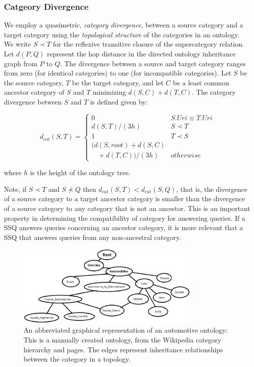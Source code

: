 \subsubsection{Catgeory Divergence}
\label{sec:ctd}

We employ a quasimetric, \textit{category
divergence},
between a source category and a target category using the \textit{topological
structure} of the categories in an ontology. We write $S \prec T$ for the
reflexive
transitive closure of the supercategory relation. Let $d(P,Q)$ represent the hop
distance in the directed ontology inheritance graph from $P$ to $Q$. The
divergence between a source and target category ranges from zero (for identical
categories) to one (for incompatible categories). Let $S$ be the source
category, $T$ be
the target category, and let $C$ be a least common ancestor category of $S$ and
$T$
minimizing $d(S,C) + d(T,C)$. The category divergence between $S$ and $T$ is
defined given by:

\begin{equation}
d_{cat}(S, T) = \begin{cases}
0 & S.{Uri} \equiv T.{Uri}\\
d(S, T)/(3h) & S \prec T\\
1 & T \prec S\\
(d(S,root) + d(S,C) \\ \ \ \ \ + d(T,C))/(3h) & otherwise
\end{cases}
\end{equation}

\noindent where $h$ is the height of the ontology tree.

Note, if $S \prec T$ and $S \not\prec Q$ then $d_{cat}(S,T) <
d_{cat}(S,Q)$, that is, the divergence of a source category to a target
ancestor category is smaller than the divergence of a source category to any
category that is not an ancestor. This is an important property in
determining the compatibility of category for answering queries.  If a
SSQ answers queries concerning an ancestor category, it is more relevant
that a SSQ that answers queries from any non-ancestral category.

\begin{figure}[t]
\centering
\includegraphics[width=90mm]{img/automotive_ontology.eps}
\caption{An abbreviated graphical representation of an automotive
ontology: This is a manually created ontology, from the Wikipedia category
hierarchy and pages. The edges represent inheritance relationships between the
category in a topology.}
\label{fig:automotive_ontology}
\end{figure}

